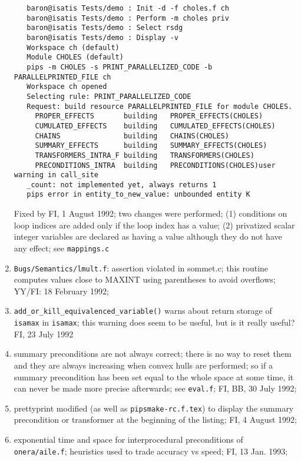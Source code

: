 \begin{enumerate}
\begin{verbatim}
   baron@isatis Tests/demo : Init -d -f choles.f ch
   baron@isatis Tests/demo : Perform -m choles priv
   baron@isatis Tests/demo : Select rsdg
   baron@isatis Tests/demo : Display -v
   Workspace ch (default)
   Module CHOLES (default)
   pips -m CHOLES -s PRINT_PARALLELIZED_CODE -b PARALLELPRINTED_FILE ch
   Workspace ch opened
   Selecting rule: PRINT_PARALLELIZED_CODE
   Request: build resource PARALLELPRINTED_FILE for module CHOLES.
     PROPER_EFFECTS       building   PROPER_EFFECTS(CHOLES)
     CUMULATED_EFFECTS    building   CUMULATED_EFFECTS(CHOLES)
     CHAINS               building   CHAINS(CHOLES)
     SUMMARY_EFFECTS      building   SUMMARY_EFFECTS(CHOLES)
     TRANSFORMERS_INTRA_F building   TRANSFORMERS(CHOLES)
     PRECONDITIONS_INTRA  building   PRECONDITIONS(CHOLES)user warning in call_site
   _count: not implemented yet, always returns 1
   pips error in entity_to_new_value: unbounded entity K
\end{verbatim}

	Fixed by FI, 1 August 1992; two changes were performed; (1) conditions
	on loop indices are added only if the loop index has a value;
	(2) privatized scalar integer variables are declared as having
	a value although they do not have any effect; see \verb+mappings.c+

  \item \verb+Bugs/Semantics/lmult.f+: assertion violated in sommet.c;
	this routine computes values close to MAXINT using parentheses
	to avoid overflows; YY/FI: 18 February 1992;

  \item \verb+add_or_kill_equivalenced_variable()+ warns about return
	storage of \verb+isamax+ in \verb+isamax+; this warning does
	seem to be useful, but is it really useful? FI, 23 July 1992

  \item summary preconditions are not always correct; there is no way
	to reset them and they are always increasing when convex hulls
	are performed; so if a summary precondition has been set equal
	to the whole space at some time, it can never be made more
	precise afterwards; see \verb+eval.f+; FI, BB, 30 July 1992;

  \item prettyprint modified (as well as \verb+pipsmake-rc.f.tex+) 
	to display the summary precondition or transformer
	at the beginning of the listing;
	FI, 4 August 1992;

  \item exponential time and space for interprocedural preconditions
	of \verb+onera/aile.f+; heuristics used to trade accuracy
	vs speed; FI, 13 Jan. 1993;


\end{enumerate}
